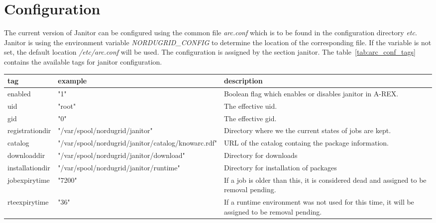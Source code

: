 \section{Configuration}\label{sec:janitor_configuration}

The current version of Janitor can be configured using the common file \textit{arc.conf} which is to be found in the 
configuration directory \textit{etc}. Janitor is using the environment variable \textit{NORDUGRID\_CONFIG} to determine the location 
of the corresponding file. If the variable is not set, the default location \textit{/etc/arc.conf} will be used. 
The configuration is assigned by the section \lbrack janitor\rbrack. The table~\ref{tab:arc_conf_tags} contains the available tags
for janitor configuration.
\begin{landscape}
\begin{table}[!h]
   \begin{center}
	\label{tab:arc_conf_tags}
	\begin{longtable}{|p{3cm}|p{10cm}||p{10cm}|}
	\hline
	   \textbf{tag}    & \textbf{example}                      & \textbf{description}\\
        \hline
           enabled         & "1"                                   & Boolean flag which enables or disables janitor in A-REX.\\
	   uid             & "root"                                & The effective uid. \\
	   gid             & "0"                                   & The effective gid. \\
	   registrationdir & "/var/spool/nordugrid/janitor"        & Directory where we the current states of jobs are kept. \\
	   catalog         & "/var/spool/nordugrid/janitor/catalog/knowarc.rdf"& URL of the catalog containg the package information.\\
	   downloaddir     & "/var/spool/nordugrid/janitor/download" & Directory for downloads \\
	   installationdir & "/var/spool/nordugrid/janitor/runtime"& Directory for installation of packages                   \\
	   jobexpirytime   & "7200"                                & If a job is older than this, it is considered dead and assigned to be removal pending.\\
	   rteexpirytime   & "36"                                  & If a runtime environment was not used for this time, it will be assigned to be removal pending.\\

\end{longtable}
\end{center}
\end{table}
\end{landscape}
